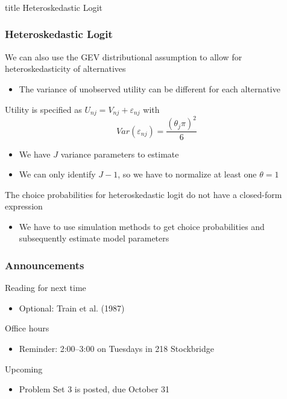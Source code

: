 \documentclass{beamer}
\begin{document}
\begin{frame}\frametitle{}
    \vfill
    \centering
    \begin{beamercolorbox}[center]{title}
        \Large Heteroskedastic Logit
    \end{beamercolorbox}
    \vfill
\end{frame}

\begin{frame}\frametitle{Heteroskedastic Logit}
    We can also use the GEV distributional assumption to allow for heteroskedasticity of alternatives
    \begin{itemize}
    	\item The variance of unobserved utility can be different for each alternative
    \end{itemize}
    \vspace{2ex}
    Utility is specified as $U_{nj} = V_{nj} + \varepsilon_{nj}$ with
    $$Var(\varepsilon_{nj}) = \frac{(\theta_j \pi)^2}{6}$$
    \begin{itemize}
    	\item We have $J$ variance parameters to estimate
    	\item We can only identify $J - 1$, so we have to normalize at least one $\theta = 1$
    \end{itemize}
    \vspace{2ex}
    The choice probabilities for heteroskedastic logit do not have a closed-form expression
    \begin{itemize}
    	\item We have to use simulation methods to get choice probabilities and subsequently estimate model parameters
    \end{itemize}
\end{frame}

\begin{frame}\frametitle{Announcements}
    Reading for next time
    \begin{itemize}
        \item Optional: Train et al. (1987)
    \end{itemize}
    \vspace{3ex}
    Office hours
    \begin{itemize}
    	\item Reminder: 2:00--3:00 on Tuesdays in 218 Stockbridge
    \end{itemize}
    \vspace{3ex}
    Upcoming
    \begin{itemize}
        \item Problem Set 3 is posted, due October 31
    \end{itemize}
\end{frame}
\end{document}
